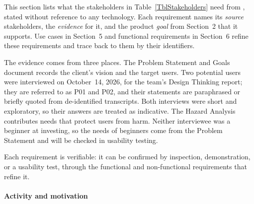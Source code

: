 \documentclass[12pt]{article}
\begin{document}


This section lists what the stakeholders in Table~\ref{TblStakeholders} need
from \progname{}, stated without reference to any technology. Each
requirement names its \emph{source} stakeholders, the \emph{evidence} for it,
and the product \emph{goal} from Section~2 that it supports. Use cases in
Section~5 and functional requirements in Section~6 refine these requirements
and trace back to them by their identifiers.

The evidence comes from three places. The Problem Statement and Goals document
records the client's vision and the target users. Two potential users were
interviewed on October~14, 2026, for the team's Design Thinking report; they
are referred to as P01 and P02, and their statements are paraphrased or
briefly quoted from de-identified transcripts. Both interviews were short and
exploratory, so their answers are treated as indicative. The Hazard Analysis contributes
needs that protect users from harm. Neither interviewee was a beginner at
investing, so the needs of beginners come from the Problem Statement and will
be checked in usability testing.

Each requirement is verifiable: it can be confirmed by inspection,
demonstration, or a usability test, through the functional and non-functional
requirements that refine it.

\paragraph{Activity and motivation}
\end{document}

